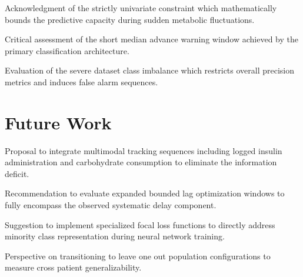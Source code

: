 \begin{planned}
    \item Acknowledgment of the strictly univariate constraint which mathematically bounds the predictive capacity during sudden metabolic fluctuations.
    \item Critical assessment of the short median advance warning window achieved by the primary classification architecture.
    \item Evaluation of the severe dataset class imbalance which restricts overall precision metrics and induces false alarm sequences.
\end{planned}

\section{Future Work}
\label{sec:conc:futurework}

\begin{planned}
    \item Proposal to integrate multimodal tracking sequences including logged insulin administration and carbohydrate consumption to eliminate the information deficit.
    \item Recommendation to evaluate expanded bounded lag optimization windows to fully encompass the observed systematic delay component.
    \item Suggestion to implement specialized focal loss functions to directly address minority class representation during neural network training.
    \item Perspective on transitioning to leave one out population configurations to measure cross patient generalizability.
\end{planned}